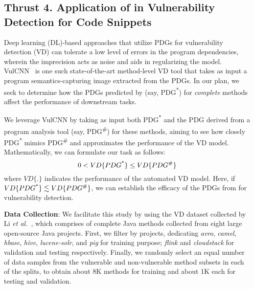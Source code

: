 \subsection{Thrust 4. Application of {\tool} in Vulnerability Detection for Code Snippets}
\label{sec:thrust4}




Deep learning (DL)-based approaches that utilize PDGs for
vulnerability detection (VD) can tolerate a low level of errors in the
program dependencies, wherein the imprecision acts as noise and aids
in regularizing the model. VulCNN~\cite{wu2022vulcnn} is one such
state-of-the-art method-level VD tool that takes as input a program
semantics-capturing image extracted from the PDGs. In our plan,
we seek to determine how the PDGs predicted by \tool (say,
PDG\textsuperscript{*}) for {\em complete} methods affect the
performance of downstream tasks.


We leverage VulCNN by taking as input both PDG\textsuperscript{*} and
the PDG derived from a program analysis tool (say,
PDG\textsuperscript{\#}) for these methods, aiming to see how closely
PDG\textsuperscript{*} mimics PDG\textsuperscript{\#} and approximates
the performance of the VD model. Mathematically, we can formulate our
task as follows:
\begin{equation}
    \centering
    0 < VD\{PDG\textsuperscript{*}\} \leq VD\{PDG\textsuperscript{\#}\}
\end{equation}
where $VD\{.\}$ indicates the performance of the automated VD model. Here, if $VD\{PDG\textsuperscript{*}\} \lesssim VD\{PDG\textsuperscript{\#}\}$, we can establish the efficacy of the PDGs from \tool for vulnerability detection.


{\bf Data Collection}: We facilitate this study by using the VD
dataset collected by Li {\em et al.}~\cite{yioopsla19}, which
comprises of
complete Java methods collected from eight large
open-source Java projects. First, we filter by projects, dedicating
\textit{avro}, \textit{camel}, \textit{hbase}, \textit{hive},
\textit{lucene-solr}, and \textit{pig} for training purpose;
\textit{flink} and \textit{cloudstack} for validation and testing
respectively.
Finally, we randomly select an equal number of data samples from the
vulnerable and non-vulnerable method subsets in each of the splits, to
obtain about 8K methods for training and about 1K each for testing and
validation.

